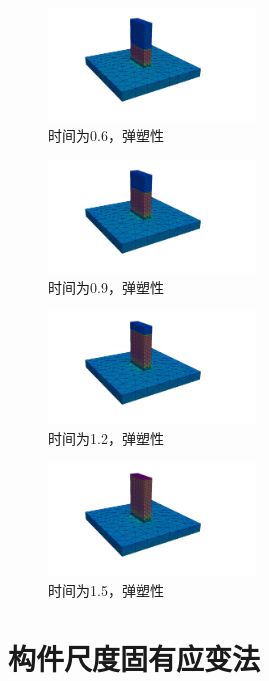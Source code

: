 \begin{figure}[!htbp]
  \centering
  \includegraphics[height=3cm]{fig/4/4.1.6/4.1.6.7.png}
  \caption{时间为0.6，弹塑性}
  \label{fig:4.1.4:4}
\end{figure}

\begin{figure}[!htbp]
  \centering
  \includegraphics[height=3cm]{fig/4/4.1.6/4.1.6.8.png}
  \caption{时间为0.9，弹塑性}
  \label{fig:4.1.4:4}
\end{figure}

\begin{figure}[!htbp]
  \centering
  \includegraphics[height=3cm]{fig/4/4.1.6/4.1.6.9.png}
  \caption{时间为1.2，弹塑性}
  \label{fig:4.1.4:4}
\end{figure}

\begin{figure}[!htbp]
  \centering
  \includegraphics[height=3cm]{fig/4/4.1.6/4.1.6.10.png}
  \caption{时间为1.5，弹塑性}
  \label{fig:4.1.4:4}
\end{figure}



\newpage
\section{构件尺度固有应变法}

